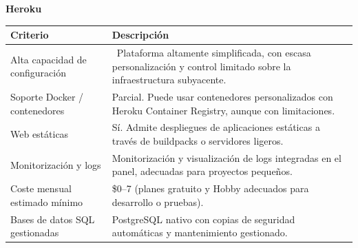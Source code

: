 \begin{center}
	\renewcommand{\arraystretch}{1.2}
	\setlength{\tabcolsep}{6pt}
	\textbf{Heroku}\\[4pt]
	\begin{tabularx}{\textwidth}{|l|X|}
		\hline
		\textbf{Criterio}               & \textbf{Descripción}                                                                                                          \\
		\hline
		Alta capacidad de configuración & \xmark\ Plataforma altamente simplificada, con escasa personalización y control limitado sobre la infraestructura subyacente. \\
		\hline
		Soporte Docker / contenedores   & Parcial. Puede usar contenedores personalizados con Heroku Container Registry, aunque con limitaciones.                       \\
		\hline
		Web estáticas                   & Sí. Admite despliegues de aplicaciones estáticas a través de buildpacks o servidores ligeros.                                 \\
		\hline
		Monitorización y logs           & Monitorización y visualización de logs integradas en el panel, adecuadas para proyectos pequeños.                             \\
		\hline
		Coste mensual estimado mínimo   & \$0--7 (planes gratuito y Hobby adecuados para desarrollo o pruebas).                                                         \\
		\hline
		Bases de datos SQL gestionadas  & PostgreSQL nativo con copias de seguridad automáticas y mantenimiento gestionado.                                             \\
		\hline
	\end{tabularx}
\end{center}

\vspace{8pt}

